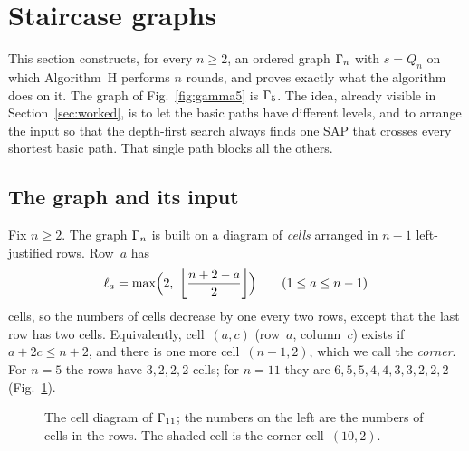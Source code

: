 \section{Staircase graphs}
\label{sec:staircase}

This section constructs, for every $n\ge2$, an ordered graph $\Gamma_n$
with $s=Q_n$ on which Algorithm~H performs $n$ rounds, and proves exactly
what the algorithm does on it. The graph of Fig.~\ref{fig:gamma5} is
$\Gamma_5$. The idea, already visible in Section~\ref{sec:worked}, is to let
the basic paths have different levels, and to arrange the input so that
the depth-first search always finds one SAP that crosses every shortest
basic path. That single path blocks all the others.

\subsection{The graph and its input}
\label{sec:gamma}

Fix $n\ge2$. The graph $\Gamma_n$ is built on a diagram of \emph{cells}
arranged in $n-1$ left-justified rows. Row~$a$ has
\[
   \ell_a=\max\Bigl(2,\ \bigfloor{\frac{n+2-a}{2}}\Bigr)\qquad(1\le a\le n-1)
\]
cells, so the numbers of cells decrease by one every two rows, except that the
last row has two cells. Equivalently, cell~$(a,c)$ (row~$a$, column~$c$)
exists if $a+2c\le n+2$, and there is one more cell~$(n-1,2)$, which we
call the \emph{corner}. For $n=5$ the rows have $3,2,2,2$ cells; for
$n=11$ they are $6,5,5,4,4,3,3,2,2,2$ (Fig.~\ref{fig:shape}).

\begin{figure}[ht]
\centering

\caption{The cell diagram of $\Gamma_{11}$; the numbers on the left are the
numbers of cells in the rows. The shaded cell is the corner cell~$(10,2)$.}
\label{fig:shape}
\end{figure}

